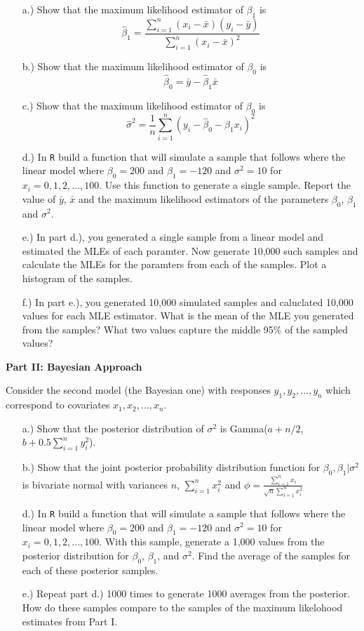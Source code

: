 \documentclass[11pt]{article}\usepackage[]{graphicx}\usepackage[]{color}
\begin{document}
\begin{itemize}
   \item[a.)] Show that the maximum likelihood estimator of $\beta_1$ is 
      \[
         \hat{\beta}_1 = \dfrac{\sum_{i=1}^n (x_i - \bar{x})(y_i - \bar{y})}{\sum_{i=1}^n (x_i - \bar{x})^2}
      \]
   \item[b.)] Show that the maximum likelihood estimator of $\beta_0$ is 
      \[
         \hat{\beta}_0 = \bar{y} - \hat{\beta}_1 \bar{x} 
      \]
   \item[c.)] Show that the maximum likelihood estimator of $\beta_0$ is 
      \[
         \hat{\sigma}^2 = \frac{1}{n} \sum_{i=1}^n \left(y_i - \hat{\beta}_0 - \hat{\beta}_1 x_i \right)^2
      \]
   \item[d.)] In \verb!R! build a function that will simulate a sample that follows where the linear model where $\beta_0 = 200$ and $\beta_1 = -120$ and $\sigma^2 = 10$ for $x_i = 0, 1, 2, ..., 100$. Use this function to generate a single sample. Report the value of $\bar{y}$, $\bar{x}$ and the maximum likelihood estimators of the parameters $\beta_0$, $\beta_1$ and $\sigma^2$.
   \item[e.)] In part d.), you generated a single sample from a linear model and estimated the MLEs of each paramter. Now generate 10,000 such samples and calculate the MLEs for the paramters from each of the samples. Plot a histogram of the samples.
   \item[f.)] In part e.), you generated 10,000 simulated samples and caluclated 10,000 values for each MLE estimator. What is the mean of the MLE you generated from the samples? What two values capture the middle 95\% of the sampled values?
\end{itemize}


\textbf{Part II: Bayesian Approach}

Consider the second model (the Bayesian one) with responses $y_1, y_2, \ldots, y_n$ which correspond to covariates $x_1, x_2, \ldots, x_n$.

\begin{itemize}
   \item[a.)] Show that the posterior distribution of $\sigma^2$ is Gamma($a + n/2$, $b + 0.5 \sum_{i=1}^n y_i^2$).
   \item[b.)] Show that the joint posterior probability distribution function for 
      $\beta_0, \beta_1 | \sigma^2$
      is bivariate normal with variances 
      $n$, 
      $\sum_{i=1}^n x_i^2$
      and 
      $\phi = \frac{\sum_{i=1}^n x_i}{\sqrt{n}{\sum_{i=1}^n x_i^2}}$

   \item[d.)] In \verb!R! build a function that will simulate a sample that follows where the linear model where $\beta_0 = 200$ and $\beta_1 = -120$ and $\sigma^2 = 10$ for $x_i = 0, 1, 2, ..., 100$.  With this sample, generate a 1,000 values from the posterior distribution for $\beta_0$, $\beta_1$, and $\sigma^2$. Find the average of the samples for each of these posterior samples.
   \item[e.)] Repeat part d.) 1000 times to generate 1000 averages from the posterior. How do these samples compare to the samples of the maximum likelohood estimates from Part I.
\end{itemize}
\end{document}
